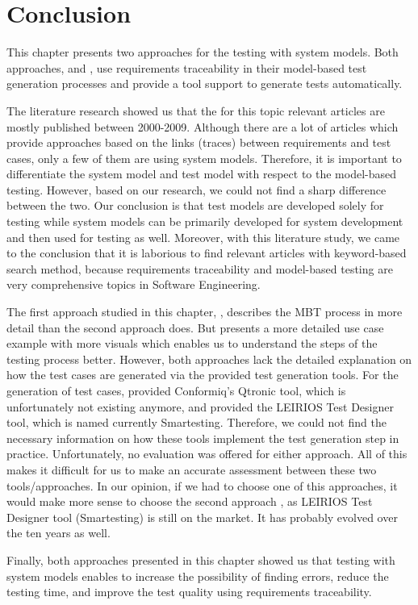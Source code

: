 \newpage
\section{Conclusion}
\label{sec:Conc} 
This chapter presents two approaches for the testing with system models. Both approaches, \cite{Paper1} and \cite{Paper2}, use requirements traceability in their model-based test generation processes and provide a tool support to generate tests automatically. 

The literature research showed us that the for this topic relevant articles are mostly published between 2000-2009. Although there are a lot of articles which provide approaches based on the links (traces) between requirements and test cases, only a few of them are using system models. Therefore, it is important to differentiate the system model and test model with respect to the model-based testing. However, based on our research, we could not find a sharp difference between the two. Our conclusion is that test models are developed solely for testing while system models can be primarily developed for system development and then used for testing as well. Moreover, with this literature study, we came to the conclusion that it is laborious to find relevant articles with keyword-based search method, because requirements traceability and model-based testing are very comprehensive topics in Software Engineering. 

The first approach studied in this chapter, \cite{Paper1}, describes the MBT process in more detail than the second approach \cite{Paper2} does. But \cite{Paper2} presents a more detailed use case example with more visuals which enables us to understand the steps of the testing process better. However, both approaches lack the detailed explanation on how the test cases are generated via the provided test generation tools. For the generation of test cases, \cite{Paper1} provided Conformiq's Qtronic tool, which is unfortunately not existing anymore, and \cite{Paper2} provided the LEIRIOS Test Designer tool, which is named currently Smartesting. Therefore, we could not find the necessary information on how these tools implement the test generation step in practice. Unfortunately, no evaluation was offered for either approach. All of this makes it difficult for us to make an accurate assessment between these two tools/approaches. In our opinion, if we had to choose one of this approaches, it would make more sense to choose the second approach \cite{Paper2}, as LEIRIOS Test Designer tool (Smartesting) is still on the market. It has probably evolved over the ten years as well.

Finally, both approaches presented in this chapter showed us that testing with system models enables to increase the possibility of finding errors, reduce the testing time, and improve the test quality using requirements traceability.
